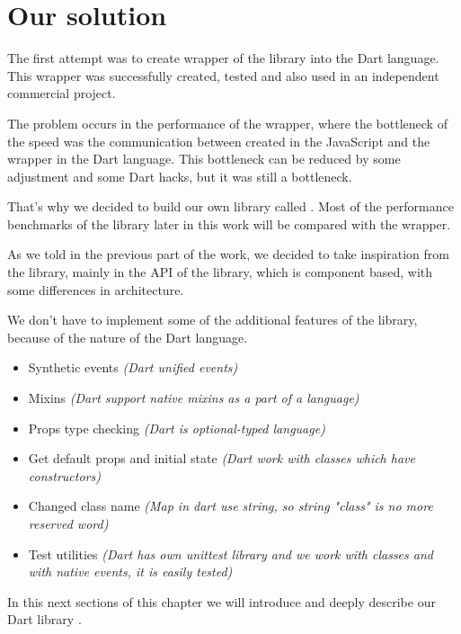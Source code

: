 \documentclass[oneside, 12pt]{book}
\begin{document}

\chapter{Our solution}\label{chap:oursolution}

The first attempt was to create wrapper of the \react library into the Dart language. 
This wrapper was successfully created, tested and also used in an independent commercial project. 

The problem occurs in the performance of the wrapper, 
where the bottleneck of the speed was the communication between \react created in the JavaScript and the wrapper in the Dart language. 
This bottleneck can be reduced by some adjustment and some Dart hacks, but it was still a bottleneck. 

That's why we decided to build our own library called \tiles.
Most of the performance benchmarks of the \tiles library later in this work will be compared with the \react wrapper. 

As we told in the previous part of the work, 
we decided to take inspiration from the \facebook \react library,
mainly in the API of the library, which is component based, 
with some differences in architecture.

We don't have to implement some of the additional features of the \react library, because of the nature of the Dart language.
\begin{itemize}
  \item Synthetic events \textit{(Dart unified events)}
  \item Mixins \textit{(Dart support native mixins as a part of a language)}
  \item Props type checking \textit{(Dart is optional-typed language)}
  \item Get default props and initial state \textit{(Dart work with classes which have constructors)}
  \item Changed class name \textit{(Map in dart use string, so string "class" is no more reserved word)}
  \item Test utilities \textit{(Dart has own unittest library and we work with classes and with native events, it is easily tested)}
\end{itemize}

In this next sections of this chapter we will introduce and deeply describe our Dart library \tiles.
\end{document}
